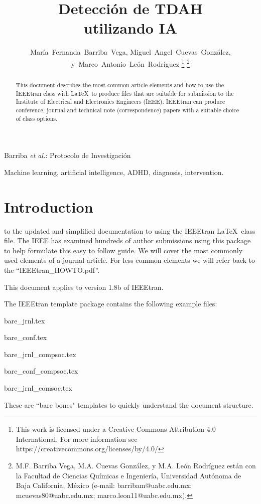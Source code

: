 \documentclass[10pt,journal,compsoc]{IEEEtran}
\begin{document}
\title{Detección de TDAH \\ utilizando IA}

\author{María~Fernanda~Barriba~Vega,
    Miguel~Angel~Cuevas~González,
    y~Marco~Antonio~León~Rodríguez%
    \thanks{This work is licensed under a Creative Commons Attribution 4.0 International. For more information see https://creativecommons.org/licenses/by/4.0/}%
    \thanks{M.F. Barriba Vega, M.A. Cuevas González, y M.A. León Rodríguez están con la Facultad de Ciencias Químicas e Ingeniería, Universidad Autónoma de Baja California, México (e-mail: barribam@uabc.edu.mx; mcuevas80@uabc.edu.mx; marco.leon11@uabc.edu.mx).}}

%
{Barriba \MakeLowercase{\textit{et al.}}: Protocolo de Investigación}

\maketitle

\begin{abstract}
    This document describes the most common article elements and how to use the IEEEtran class with \LaTeX \ to produce files that are suitable for submission to the Institute of Electrical and Electronics Engineers (IEEE).  IEEEtran can produce conference, journal and technical note (correspondence) papers with a suitable choice of class options.
\end{abstract}

\begin{IEEEkeywords}
    Machine learning, artificial intelligence, ADHD, diagnosis, intervention.
\end{IEEEkeywords}

\section{Introduction}
 to the updated and simplified documentation to using the IEEEtran \LaTeX \ class file. The IEEE has examined hundreds of author submissions using this package to help formulate this easy to follow guide. We will cover the most commonly used elements of a journal article. For less common elements we will refer back to the ``IEEEtran\_HOWTO.pdf''.

This document applies to version 1.8b of IEEEtran.

The IEEEtran template package contains the following example files:
\begin{list}{}{}
    \item{bare\_jrnl.tex}
    \item{bare\_conf.tex}
    \item{bare\_jrnl\_compsoc.tex}
    \item{bare\_conf\_compsoc.tex}
    \item{bare\_jrnl\_comsoc.tex}
\end{list}
These are ``bare bones" templates to quickly understand the document structure.
\end{document}
